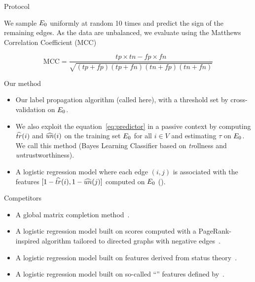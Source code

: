 \documentclass[svgnames,ignorenonframetext,final]{beamer}
\begin{document}
\begin{frame}{Protocol}

We sample \(E_0\) uniformly at random 10 times and predict the sign
of the remaining edges. As the data are unbalanced, we evaluate using
the Matthews Correlation Coefficient (MCC)

\[\mathrm{MCC} = \frac{tp\times tn-fp\times fn} {\sqrt{ (tp + fp) ( tp + fn ) ( tn + fp ) ( tn + fn ) } }\]

\end{frame}

\begin{frame}{Our method}
\begin{itemize}
\item
  Our label propagation algorithm (called \uslpropGsec{} here), with a
  threshold set by cross-validation on \(E_0{}\).
\item
  We also exploit the equation~\eqref{eq:predictor} in a passive context by computing
  \(\widehat{tr}(i)\) and \(\widehat{un}(i)\) on the training set \(E_0\) for all
  \(i \in V\) and estimating \(\tau\) on \(E_0\). We call this
  method \usrule{} (Bayes Learning Classifier based on \emph{tr}ollness
  and \emph{un}trustworthiness).
\item
  A logistic regression model where each edge \((i,j)\) is associated
  with the features \([1-\widehat{tr}(i),  1-\widehat{un}(j)]\) computed on \(E_0\)
  (\uslogregp{}).
\end{itemize}
\end{frame}

\begin{frame}{Competitors}
\begin{itemize}
\item
  A global \complowrank{} matrix completion
  method~\autocite{lowrankcompletion14}.
\item
  A logistic regression model built on \compranknodes{} scores computed
  with a PageRank-inspired algorithm tailored to directed graphs with
  negative edges~\autocite{wu2016troll}.
\item
  A logistic regression model built on \comptriads{} features derived
  from status theory~\autocite{leskovec2010}.
\item
  A logistic regression model built on so-called ``\compbayesian{}''
  features defined by~\autocite{Bayesian15}.
\end{itemize}

\end{frame}
\end{document}
